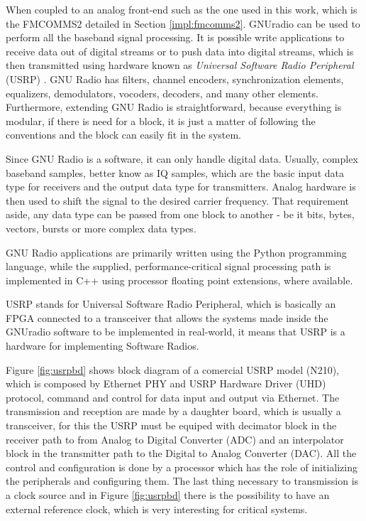 When coupled to an analog front-end such as the one used in this work, which is
the FMCOMMS2 detailed in Section \ref{impl:fmcomms2}. GNUradio can be used to
perform all the baseband signal processing. It is possible write applications to
receive data out of digital streams or to push data into digital streams, which
is then transmitted using hardware known as \textit{Universal Software Radio
Peripheral} (USRP) \cite{web:usrp}. GNU Radio has filters, channel encoders,
synchronization elements, equalizers, demodulators, vocoders, decoders, and many
other elements. Furthermore, extending GNU Radio is straightforward, because
everything is modular, if there is need for a block, it is just a matter of
following the conventions and the block can easily fit in the system.

Since GNU Radio is a software, it can only handle digital data. Usually, complex
baseband samples, better know as IQ samples, which are the basic input data type
for receivers and the output data type for transmitters. Analog hardware is then
used to shift the signal to the desired carrier frequency. That requirement
aside, any data type can be passed from one block to another - be it bits,
bytes, vectors, bursts or more complex data types.

GNU Radio applications are primarily written using the Python programming
language, while the supplied, performance-critical signal processing path is
implemented in C++ using processor floating point extensions, where available.

USRP stands for Universal Software Radio Peripheral, which is basically an FPGA
connected to a transceiver that allows the systems made inside the GNUradio
software to be implemented in real-world, it means that USRP is a hardware for
implementing Software Radios.

Figure \ref{fig:usrpbd} shows block diagram of a comercial USRP model (N210),
which is composed by Ethernet PHY and USRP Hardware Driver (UHD) protocol,
command and control for data input and output via Ethernet. The transmission and
reception are made by a daughter board, which is usually a transceiver, for this
the USRP must be equiped with decimator block in the receiver path to from
Analog to Digital Converter (ADC) and an interpolator block in the transmitter
path to the Digital to Analog Converter (DAC). All the control and configuration
is done by a processor which has the role of initializing the peripherals and
configuring them. The last thing necessary to transmission is a clock source and
in Figure \ref{fig:usrpbd} there is the possibility to have an external
reference clock, which is very interesting for critical systems.

